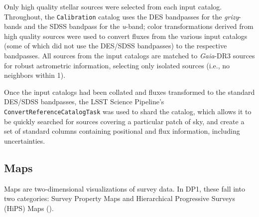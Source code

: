 \begin{itemize}
Only high quality stellar sources were selected from each input catalog. Throughout, the \texttt{Calibration} catalog uses the DES bandpasses for the \textit{grizy}-bands and the SDSS bandpass for the \textit{u}-band; color transformations derived from high quality sources were used to convert fluxes from the various input catalogs (some of which did not use the DES/SDSS bandpasses) to the respective bandpasses. All sources from the input catalogs are matched to \textit{Gaia}-DR3 sources for robust astrometric information, selecting only isolated sources (i.e., no neighbors within 1\arcsec).

Once the input catalogs had been collated and fluxes transformed to the standard DES/SDSS bandpasses, the LSST Science Pipeline's \texttt{ConvertReferenceCatalogTask} was used to shard the catalog, which allows it to be quickly searched for sources covering a particular patch of sky, and create a set of standard columns containing positional and flux information, including uncertainties.


\end{itemize}





\subsection{Maps}
Maps are two-dimensional visualizations of survey data. In DP1, these fall into two categories: Survey Property Maps and Hierarchical Progressive Surveys (HiPS) Maps (\citealt{2015A&A...578A.114F}). 

